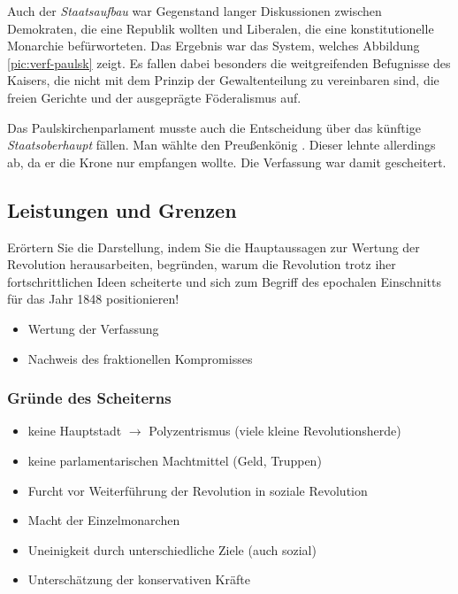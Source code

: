 Auch der \emph{Staatsaufbau} war Gegenstand langer Diskussionen zwischen
Demokraten, die eine Republik wollten und Liberalen, die eine
konstitutionelle Monarchie befürworteten. Das Ergebnis war das
System, welches Abbildung \ref{pic:verf-paulsk} zeigt.  Es fallen dabei besonders die weitgreifenden Befugnisse des
Kaisers, die nicht mit dem Prinzip der Gewaltenteilung zu vereinbaren
sind, die freien Gerichte und der ausgeprägte Föderalismus auf.

Das Paulskirchenparlament musste auch die Entscheidung über das
künftige \emph{Staatsoberhaupt} fällen. Man wählte den Preußenkönig
. Dieser lehnte allerdings ab, da er die
Krone nur  empfangen
wollte. Die Verfassung war damit gescheitert.


\subsection{Leistungen und Grenzen}

\begin{aufgabe}
Erörtern Sie die Darstellung, indem Sie die Hauptaussagen zur Wertung
der Revolution herausarbeiten, begründen, warum die Revolution trotz
iher fortschrittlichen Ideen scheiterte und sich zum Begriff des
epochalen Einschnitts für das Jahr 1848 positionieren!
\end{aufgabe}

\begin{itemize}
\item Wertung der Verfassung
\item Nachweis des fraktionellen Kompromisses 
\end{itemize}

\subsubsection[Gründe des Scheiterns]{Gründe des
Scheiterns}

\begin{itemize}
\item keine Hauptstadt $\rightarrow$ Polyzentrismus (viele kleine
Revolutionsherde)
\item keine parlamentarischen Machtmittel (Geld, Truppen)
\item Furcht vor Weiterführung der Revolution in soziale Revolution
\item Macht der Einzelmonarchen
\item Uneinigkeit durch unterschiedliche Ziele (auch sozial)
\item Unterschätzung der konservativen Kräfte
\end{itemize}


